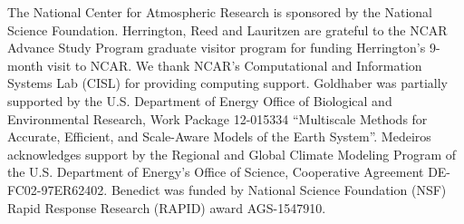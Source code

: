 \documentclass{agujournal}
\begin{document}
{%




%
%
%
%
%
%
%


\acknowledgments
The National Center for Atmospheric Research is sponsored by the National Science Foundation. Herrington, Reed and Lauritzen are grateful to the NCAR Advance Study Program graduate visitor program for funding Herrington's 9-month visit to NCAR. We thank NCAR's Computational and Information Systems Lab (CISL) for providing computing support. Goldhaber was partially supported by the U.S. Department of Energy Office of Biological and Environmental Research, Work Package 12-015334 ``Multiscale Methods for Accurate, Efficient, and Scale-Aware Models of the Earth System''. Medeiros acknowledges support by the Regional and Global Climate Modeling Program of the U.S. Department of Energy's Office of Science,  Cooperative Agreement DE-FC02-97ER62402. Benedict was funded by National Science Foundation (NSF) Rapid Response Research (RAPID) award AGS-1547910.






}
\end{document}
